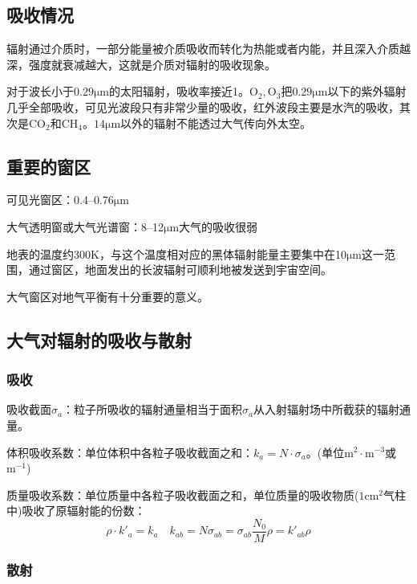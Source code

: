 \documentclass[UTF8,a4paper,11pt,oneside]{ctexbook}
\begin{document}
\subsection{吸收情况}

辐射通过介质时，一部分能量被介质吸收而转化为热能或者内能，并且深入介质越深，强度就衰减越大，这就是介质对辐射的吸收现象。

对于波长小于\(0.29\mathrm{\mathrm{\mu{}m}}\)的太阳辐射，吸收率接近1。\(\mathrm{O}_2,\mathrm{O}_3\)把\(0.29\mathrm{\mathrm{\mu{}m}}\)以下的紫外辐射几乎全部吸收，可见光波段只有非常少量的吸收，红外波段主要是水汽的吸收，其次是\(\mathrm{CO}_2\)和\(\mathrm{CH}_4\)。\(14\mathrm{\mathrm{\mu{}m}}\)以外的辐射不能透过大气传向外太空。

\subsection{重要的窗区}

可见光窗区：0.4--0.76\(\mathrm{\mathrm{\mu{}m}}\)

大气透明窗或大气光谱窗：8--12\(\mathrm{\mathrm{\mu{}m}}\)大气的吸收很弱

地表的温度约300K，与这个温度相对应的黑体辐射能量主要集中在10\(\mathrm{\mathrm{\mu{}m}}\)这一范围，通过窗区，地面发出的长波辐射可顺利地被发送到宇宙空间。

大气窗区对地气平衡有十分重要的意义。

\subsection{大气对辐射的吸收与散射}

\subsubsection{吸收}

吸收截面\(\sigma_a\)：粒子所吸收的辐射通量相当于面积\(\sigma_a\)从入射辐射场中所截获的辐射通量。

体积吸收系数：单位体积中各粒子吸收截面之和：\(k_a=N\cdot\sigma_a\)。(单位\(\mathrm{m}^2\cdot\mathrm{m}^{-3}\)或\(\mathrm{m}^{-1}\))

质量吸收系数：单位质量中各粒子吸收截面之和，单位质量的吸收物质(\(1\mathrm{cm}^2\)气柱中)吸收了原辐射能的份数：
\begin{equation}
\rho\cdot{}k'_a=k_a\quad{}k_{ab}=N\sigma_{ab}=\sigma_{ab}\dfrac{N_0}{M}\rho=k'_{ab}\rho
\end{equation}

\subsubsection{散射}
\end{document}
